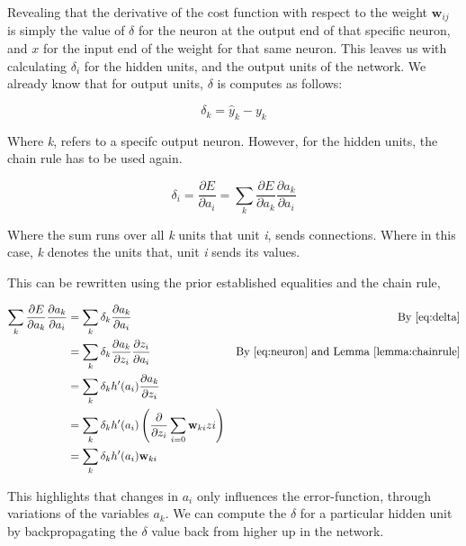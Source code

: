 Revealing that the derivative of the cost function with respect to the
weight $\mathbf{w}_{ij}$ is simply the value of $\delta$ for the neuron at the
output end of that specific neuron, and $x$ for the input end of the weight for
that same neuron. This leaves us with calculating $\delta_i$ for the hidden
units, and the output units of the network. We already know that for output
units, $\delta$ is computes as follows:

\begin{equation}
\label{eq:output}
\delta_k = \hat{y}_k - y_k
\end{equation}

Where \textit{k}, refers to a specifc output neuron.
However, for the hidden units, the chain rule has to be used again.

\begin{equation}
\label{eq:bp}
\delta_i = \frac{\partial E}{\partial a_i} =
\sum_k \frac{\partial E}{\partial a_k} \frac{\partial a_k}{\partial a_i}
\end{equation}

Where the sum runs over all \textit{k} units that unit \textit{i}, sends
connections.
Where in this case, \textit{k} denotes the units that, unit \textit{i} sends
its values.

This can be rewritten using the prior established equalities and the chain rule,


\begin{align}
\sum_k \frac{\partial E}{\partial a_k} \frac{\partial a_k}{\partial a_i} &=
\sum_k \delta_k \frac{\partial a_k}{\partial a_i} & \text{By \eqref{eq:delta}}\\
&= \sum_k \delta_k \frac{\partial a_k}{\partial z_i} \frac{\partial z_i}{\partial a_i}
& \text{By \eqref{eq:neuron} and Lemma \ref{lemma:chainrule}} \\
&= \sum_k \delta_k h'(a_i) \frac{\partial a_k}{\partial z_i} \\
&= \sum_k \delta_k h'(a_i) \left( \frac{\partial}{\partial z_i}  \sum_{i=0} \mathbf{w}_{ki} z{i}\right) \\
&= \sum_k \delta_k h'(a_i) \mathbf{w}_{ki} \\
\end{align}

This highlights that changes in $a_i$ only influences the error-function,
through variations of the variables $a_k$. We can compute the $\delta$ for a
particular hidden unit by backpropagating the $\delta$ value back from higher up
in the network.

